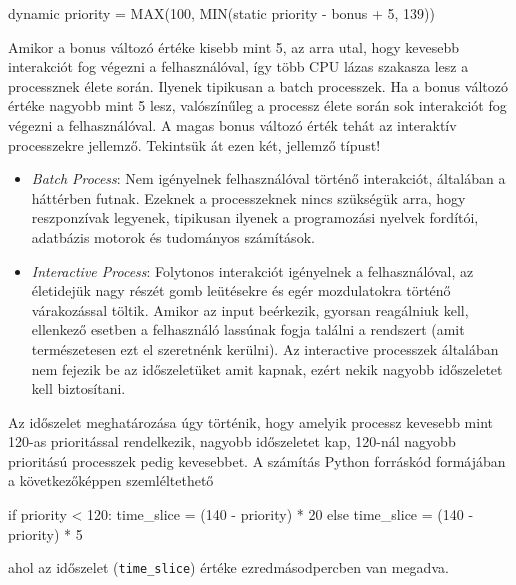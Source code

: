 \begin{cpp}
dynamic priority = MAX(100, MIN(static priority - bonus + 5, 139))
\end{cpp}
Amikor a bonus változó értéke kisebb mint 5, az arra utal, hogy kevesebb interakciót fog végezni a felhasználóval, így több CPU lázas szakasza lesz a processznek élete során. Ilyenek tipikusan a batch processzek.
Ha a bonus változó értéke nagyobb mint 5 lesz, valószínűleg a processz élete során sok interakciót fog végezni a felhasználóval. A magas bonus változó érték tehát az interaktív processzekre jellemző. Tekintsük át ezen két, jellemző típust!
\begin{itemize}
\item \textit{Batch Process}: Nem igényelnek felhasználóval történő interakciót, általában a háttérben futnak. Ezeknek a processzeknek nincs szükségük arra, hogy reszponzívak legyenek, tipikusan ilyenek a programozási nyelvek fordítói, adatbázis motorok és tudományos számítások.
\item \textit{Interactive Process}: Folytonos interakciót igényelnek a felhasználóval, az életidejük nagy részét gomb leütésekre és egér mozdulatokra történő várakozással töltik.
Amikor az input beérkezik, gyorsan reagálniuk kell, ellenkező esetben a felhasználó lassúnak fogja találni a rendszert (amit természetesen ezt el szeretnénk kerülni).
Az interactive processzek általában nem fejezik be az időszeletüket amit kapnak, ezért nekik nagyobb időszeletet kell biztosítani.
\end{itemize}

Az időszelet meghatározása úgy történik, hogy amelyik processz kevesebb mint 120-as prioritással rendelkezik, nagyobb időszeletet kap, 120-nál nagyobb prioritású processzek pedig kevesebbet. A számítás Python forráskód formájában a következőképpen szemléltethető
\begin{python}
if priority < 120:
    time_slice = (140 - priority) * 20
else
    time_slice = (140 - priority) * 5
\end{python}
ahol az időszelet (\texttt{time\_slice}) értéke ezredmásodpercben van megadva.

